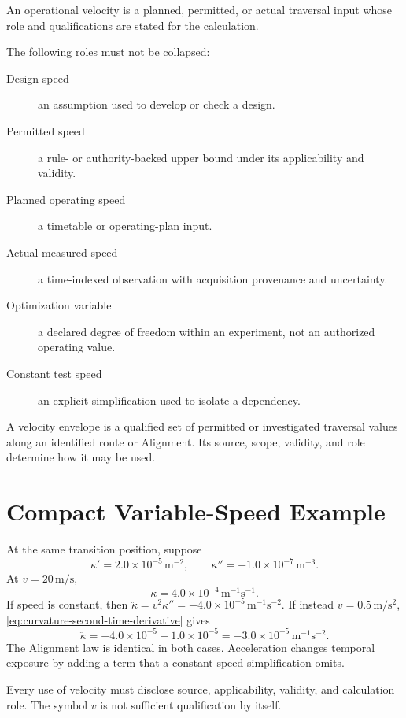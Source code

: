 \begin{definition}
\label{def:operational-velocity}
An operational velocity is a planned, permitted, or actual traversal input
whose role and qualifications are stated for the calculation.
\end{definition}

The following roles must not be collapsed:
\begin{description}
\item[Design speed] an assumption used to develop or check a design.
\item[Permitted speed] a rule- or authority-backed upper bound under its
applicability and validity.
\item[Planned operating speed] a timetable or operating-plan input.
\item[Actual measured speed] a time-indexed observation with acquisition
provenance and uncertainty.
\item[Optimization variable] a declared degree of freedom within an
experiment, not an authorized operating value.
\item[Constant test speed] an explicit simplification used to isolate a
dependency.
\end{description}

\begin{definition}
\label{def:velocity-envelope}
A velocity envelope is a qualified set of permitted or investigated traversal
values along an identified route or Alignment. Its source, scope, validity,
and role determine how it may be used.
\end{definition}

\section{Compact Variable-Speed Example}

At the same transition position, suppose
\[
\kappa'=2.0\times10^{-5}\,\mathrm{m^{-2}},
\qquad
\kappa''=-1.0\times10^{-7}\,\mathrm{m^{-3}}.
\]
At \(v=20\,\mathrm{m/s}\),
\[
\dot\kappa=4.0\times10^{-4}\,\mathrm{m^{-1}s^{-1}}.
\]
If speed is constant, then
\(\ddot\kappa=v^2\kappa''=-4.0\times10^{-5}\,
\mathrm{m^{-1}s^{-2}}\). If instead
\(\dot v=0.5\,\mathrm{m/s^2}\), \cref{eq:curvature-second-time-derivative}
gives
\[
\ddot\kappa
=-4.0\times10^{-5}+1.0\times10^{-5}
=-3.0\times10^{-5}\,\mathrm{m^{-1}s^{-2}}.
\]
The Alignment law is identical in both cases. Acceleration changes temporal
exposure by adding a term that a constant-speed simplification omits.

\begin{summary}
Every use of velocity must disclose source, applicability, validity, and
calculation role. The symbol \(v\) is not sufficient qualification by itself.
\end{summary}

